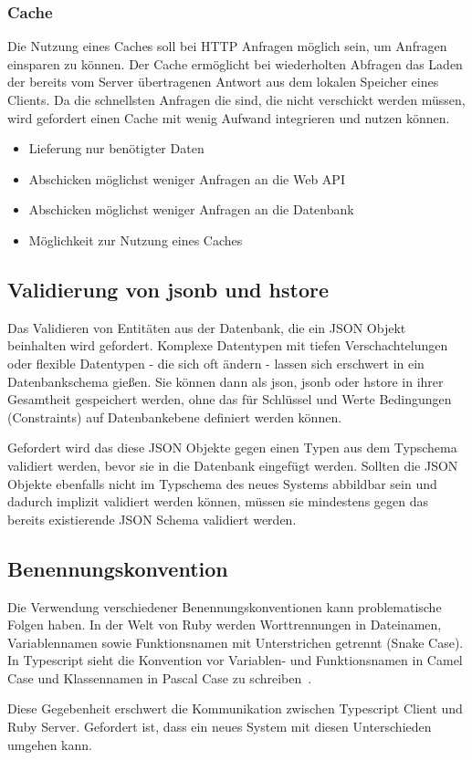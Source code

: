 \subsubsection{Cache}
Die Nutzung eines Caches soll bei HTTP Anfragen möglich sein, um Anfragen einsparen zu können. Der Cache ermöglicht bei wiederholten Abfragen das Laden der bereits vom Server übertragenen Antwort aus dem lokalen Speicher eines Clients. Da die schnellsten Anfragen die sind, die nicht verschickt werden müssen, wird gefordert einen Cache mit wenig Aufwand integrieren und nutzen können. 

\begin{itemize}
	\setlength\itemsep{-1em}
	\item Lieferung nur benötigter Daten
	\item Abschicken möglichst weniger Anfragen an die Web API
	\item Abschicken möglichst weniger Anfragen an die Datenbank
	\item Möglichkeit zur Nutzung eines Caches
\end{itemize}

\subsection{Validierung von jsonb und hstore}
\label{req:validation:json}
Das Validieren von Entitäten aus der Datenbank, die ein JSON Objekt beinhalten wird gefordert.
Komplexe Datentypen mit tiefen Verschachtelungen oder flexible Datentypen - die sich oft ändern - lassen sich erschwert in ein Datenbankschema gießen. Sie können dann als json,
jsonb oder hstore in ihrer Gesamtheit gespeichert werden, ohne das für Schlüssel und Werte Bedingungen (Constraints) auf Datenbankebene definiert werden können.

Gefordert wird das diese JSON Objekte gegen einen Typen aus dem Typschema validiert werden, bevor sie in die Datenbank eingefügt werden. Sollten die JSON Objekte ebenfalls nicht im Typschema des neues Systems abbildbar sein und dadurch implizit validiert werden können, müssen sie mindestens gegen das bereits existierende JSON Schema validiert werden.

\subsection{Benennungskonvention}
\label{req:naming:convention}
Die Verwendung verschiedener Benennungskonventionen kann problematische Folgen haben.
In der Welt von Ruby werden Worttrennungen in Dateinamen, Variablennamen sowie Funktionsnamen mit Unterstrichen getrennt (Snake Case).
In Typescript sieht die Konvention vor Variablen- und Funktionsnamen in Camel Case und Klassennamen in Pascal Case zu schreiben~\cite{typescript-conventions}.

Diese Gegebenheit erschwert die Kommunikation zwischen Typescript Client und Ruby Server. Gefordert ist, dass ein neues System mit diesen Unterschieden umgehen kann.
